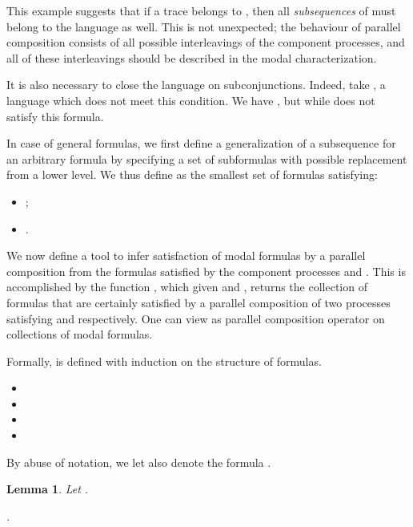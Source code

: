 \documentclass{eptcs}
\newtheorem{lemm}{Lemma}
\newenvironment{lemma}{\begin{lemm} \rm }{\end{lemm}}
\begin{document}
This example suggests that if a trace  belongs to , then all \textit{subsequences} of  must belong to the language as well. This is not unexpected; the behaviour of parallel composition consists of all possible interleavings of the component processes, and all of these interleavings should be described in the modal characterization.

It is also necessary to close the language on subconjunctions. Indeed, take , a language which does not meet this condition. We have , but  while  does not satisfy this formula.

In case of general  formulas, we first define a generalization of a subsequence for an arbitrary formula  by specifying a set of subformulas with possible replacement from a lower level. We thus define  as the smallest set of  formulas satisfying:
\begin{itemize}
\item
;
\item
.
\end{itemize}

We now define a tool to infer satisfaction of modal formulas by a parallel composition  from the formulas satisfied by the component processes  and . This is accomplished by the function , which given  and , returns the collection of formulas that are certainly satisfied by a parallel composition of two processes satisfying  and  respectively. One can view  as parallel composition operator on collections of modal formulas.

Formally,  is defined with induction on the structure of formulas.
\begin{itemize}
\item  
\item 
 

\item 

\item 

\end{itemize}

By abuse of notation, we let  also denote the formula .

\begin{lemma} Let .
\label{lem:par}
\begin{center}
.
\end{center}
\end{lemma}
\end{document}
